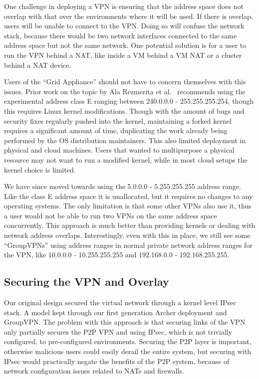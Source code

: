 \documentclass[conference]{IEEEtran}
\begin{document}
One challenge in deploying a VPN is ensuring that the address space does not
overlap with that over the environments where it will be used.  If there is
overlap, users will be unable to connect to the VPN.  Doing so will confuse the
network stack, because there would be two network interfaces connected to the
same address space but not the same network.  One potential solution is for a
user to run the VPN behind a NAT, like inside a VM behind a VM NAT or a cluster
behind a NAT device.

Users of the ``Grid Appliance'' should not have to concern themselves with this
issues.  Prior work on the topic by Ala Rezmerita et al.~\cite{pvc} recommends
using the experimental address class E ranging between 240.0.0.0 -
255.255.255.254, though this requires Linux kernel modifications.  Though with
the amount of bugs and security fixes regularly pushed into the kernel,
maintaining a forked kernel requires a significant amount of time, duplicating
the work already being performed by the OS distribution maintainers.  This also
limited deployment in physical and cloud machines.  Users that wanted to
multipurpose a physical resource may not want to run a modified kernel, while
in most cloud setups the kernel choice is limited.

We have since moved towards using the 5.0.0.0 - 5.255.255.255 address range.
Like the class E address space it is unallocated, but it requires no changes to
any operating systems.  The only limitation is that some other VPNs also use
it, thus a user would not be able to run two VPNs on the same address space
concurrently.  This approach is much better than providing kernels or dealing
with network address overlaps.  Interestingly, even with this in place, we
still see some ``GroupVPNs''  using address ranges in normal private network
address ranges for the VPN, like 10.0.0.0 - 10.255.255.255 and 192.168.0.0 -
192.168.255.255.

\subsection{Securing the VPN and Overlay}

Our original design secured the virtual network through a kernel level IPsec
stack.  A model kept through our first generation Archer deployment and
GroupVPN.  The problem with this approach is that securing links of the VPN
only partially secures the P2P VPN and using IPsec, which is not trivially
configured, to pre-configured environments.  Securing the P2P layer is
important, otherwise malicious users could easily derail the entire system, but
securing with IPsec would practically negate the benefits of the P2P system,
because of network configuration issues related to NATs and firewalls.
\end{document}
